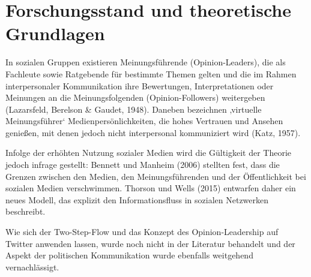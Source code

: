 \section{Forschungsstand und theoretische Grundlagen}
\label{sec:forschungsstand-und-theoretische-grundlagen}

In sozialen Gruppen existieren Meinungsführende (Opinion-Leaders), die als Fachleute sowie Ratgebende für bestimmte Themen gelten und die im Rahmen interpersonaler Kommunikation ihre Bewertungen, Interpretationen oder Meinungen an die Meinungsfolgenden (Opinion-Followers) weitergeben (Lazarsfeld, Berelson \& Gaudet, 1948). Daneben bezeichnen ‚virtuelle Meinungsführer‘ Medienpersönlichkeiten, die hohes Vertrauen und Ansehen genießen, mit denen jedoch nicht interpersonal kommuniziert wird (Katz, 1957).

Infolge der erhöhten Nutzung sozialer Medien wird die Gültigkeit der Theorie jedoch infrage gestellt: Bennett und Manheim (2006) stellten fest, dass die Grenzen zwischen den Medien, den Meinungsführenden und der Öffentlichkeit bei sozialen Medien verschwimmen. Thorson und Wells (2015) entwarfen daher ein neues Modell, das explizit den Informationsfluss in sozialen Netzwerken beschreibt.

Wie sich der Two-Step-Flow und das Konzept des Opinion-Leadership auf Twitter anwenden lassen, wurde noch nicht in der Literatur behandelt und der Aspekt der politischen Kommunikation wurde ebenfalls weitgehend vernachlässigt.